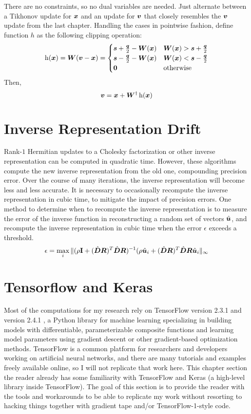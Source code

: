 There are no constraints, so no dual variables are needed. Just alternate between a Tikhonov update for $\bm{x}$ and an update for $\bm{v}$ that closely resembles the $\bm{v}$ update from the last chapter.
Handling the cases in pointwise fashion, define function $h$ as the following clipping operation:
%
\begin{equation}
\operatorname{h}(\bm{x}) = \bm{W}(\bm{v} - \bm{x}) = \begin{cases} \bm{s} + \frac{\bm{q}}{2} - \bm{W}(\bm{x}) & \bm{W}(\bm{x}) > \bm{s} + \frac{\bm{q}}{2} \\ \bm{s} - \frac{\bm{q}}{2} - \bm{W}(\bm{x}) & \bm{W}(\bm{x}) < \bm{s} - \frac{\bm{q}}{2} \\ \bm{0} & \text{otherwise}
\end{cases}
\end{equation}
%
Then,
\begin{equation}
\bm{v} = \bm{x} + \bm{W}^{\dagger}\operatorname{h}(\bm{x})
\end{equation}

\section{Inverse Representation Drift}
Rank-$1$ Hermitian updates to a Cholesky factorization or other inverse representation can be computed in quadratic time. However, these algorithms compute the new inverse representation from the old one, compounding precision error. Over the course of many iterations, the inverse representation will become less and less accurate. It is necessary to occasionally recompute the inverse representation in cubic time, to mitigate the impact of precision errors.  One method to determine when to recompute the inverse representation is to measure the error of the inverse function in reconstructing a random set of vectors $\hat{\bm{u}}$, and recompute the inverse representation in cubic time when the error $\epsilon$ exceeds a threshold.
%
\begin{equation}
\epsilon = \max_i \|(\rho{\bf I} + (\hat{\bm{D}}\bm{R})^T\hat{\bm{D}}\bm{R})^{-1}(\rho\hat{\bm{u}}_i + (\hat{\bm{D}}\bm{R})^T\hat{\bm{D}}\bm{R}\hat{\bm{u}}_i\|_{\infty}
\end{equation} 

\section{Tensorflow and Keras}
Most of the computations for my research rely on TensorFlow version 2.3.1 and version 2.4.1 \cite{tensorflow}, a Python library for machine learning specializing in building models with differentiable, parameterizable composite functions and learning model parameters using gradient descent or other gradient-based optimization methods. TensorFlow is a common platform for researchers and developers working on artificial neural networks, and there are many tutorials and examples freely available online, so I will not replicate that work here. This chapter section the reader already has some familiarity with TensorFlow and Keras \cite{keras} (a high-level library inside TensorFlow). The goal of this section is to provide the reader with the tools and workarounds to be able to replicate my work without resorting to hacking things together with gradient tape and/or TensorFlow-1-style code.

